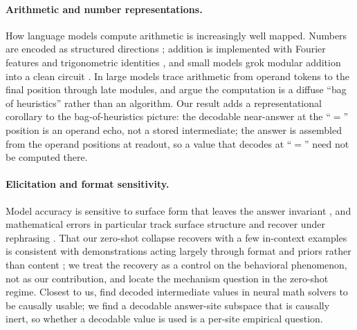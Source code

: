 \paragraph{Arithmetic and number representations.}
How language models compute arithmetic is increasingly well mapped. Numbers are encoded as
structured directions \citep{wallace-etal-2019-nlp}; addition is implemented with Fourier features
\citep{zhou-etal-2024-fourier} and trigonometric identities \citep{kantamneni-tegmark-2025-trigonometry},
and small models grok modular addition into a clean circuit \citep{nanda-etal-2023-progress,
quirke-barez-2024-understanding}. In large models \citet{stolfo-etal-2023-mechanistic} trace
arithmetic from operand tokens to the final position through late modules, and
\citet{nikankin-etal-2025-arithmetic} argue the computation is a diffuse ``bag of heuristics''
rather than an algorithm. Our result adds a representational corollary to the bag-of-heuristics
picture: the decodable near-answer at the ``$=$'' position is an operand echo, not a stored
intermediate; the answer is assembled from the operand positions at readout, so a value that
decodes at ``$=$'' need not be computed there.

\paragraph{Elicitation and format sensitivity.}
Model accuracy is sensitive to surface form that leaves the answer invariant
\citep{sclar-etal-2024-quantifying}, and mathematical errors in particular track surface structure
and recover under rephrasing \citep{williamson-etal-2025-syntactic, reusch-lehner-2022-extracting}.
That our zero-shot collapse recovers with a few in-context examples is consistent with
demonstrations acting largely through format and priors rather than content
\citep{min-etal-2022-rethinking}; we treat the recovery as a control on the behavioral phenomenon,
not as our contribution, and locate the mechanism question in the zero-shot regime. Closest to us,
\citet{matsumoto-etal-2022-tracing} find decoded intermediate values in neural math solvers to be
causally usable; we find a decodable answer-site subspace that is causally inert, so whether a
decodable value is used is a per-site empirical question.
